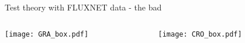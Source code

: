 \documentclass[aspectratio=169]{beamer}
\begin{document}
\begin{frame}{Test theory with FLUXNET data - the bad}
    \begin{columns}
    \begin{column}{0.5\textwidth}
      \texttt{[image: GRA\_box.pdf]}
    \end{column}
    \begin{column}{0.5\textwidth}
      \texttt{[image: CRO\_box.pdf]}
    \end{column}
  \end{columns}
\end{frame}



\end{document}
